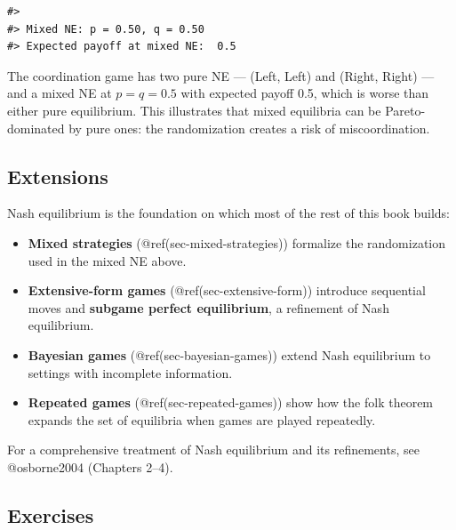 \documentclass[
]{article}
\providecommand{\tightlist}{%
  \setlength{\itemsep}{0pt}\setlength{\parskip}{0pt}}
\begin{document}
\begin{verbatim}
#> 
#> Mixed NE: p = 0.50, q = 0.50
#> Expected payoff at mixed NE:  0.5
\end{verbatim}

The coordination game has two pure NE --- (Left, Left) and (Right,
Right) --- and a mixed NE at \(p = q = 0.5\) with expected payoff 0.5,
which is worse than either pure equilibrium. This illustrates that mixed
equilibria can be Pareto-dominated by pure ones: the randomization
creates a risk of miscoordination.

\subsection{Extensions}\label{extensions}

Nash equilibrium is the foundation on which most of the rest of this
book builds:

\begin{itemize}
\tightlist
\item
  \textbf{Mixed strategies} (@ref(sec-mixed-strategies)) formalize the
  randomization used in the mixed NE above.
\item
  \textbf{Extensive-form games} (@ref(sec-extensive-form)) introduce
  sequential moves and \textbf{subgame perfect equilibrium}, a
  refinement of Nash equilibrium.
\item
  \textbf{Bayesian games} (@ref(sec-bayesian-games)) extend Nash
  equilibrium to settings with incomplete information.
\item
  \textbf{Repeated games} (@ref(sec-repeated-games)) show how the folk
  theorem expands the set of equilibria when games are played
  repeatedly.
\end{itemize}

For a comprehensive treatment of Nash equilibrium and its refinements,
see @osborne2004 (Chapters 2--4).

\subsection*{Exercises}\label{exercises}
\end{document}
